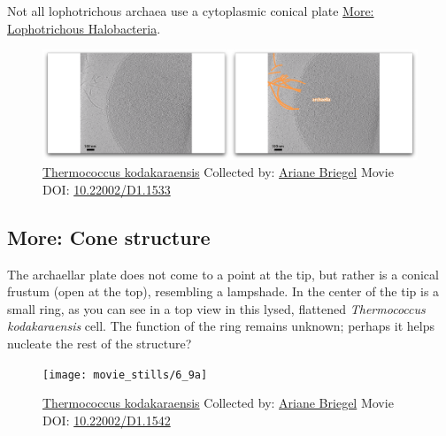 \documentclass[]{tufte-book}
\begin{document}
Not all lophotrichous archaea use a cytoplasmic conical plate
\protect\hyperlink{Lophotrichous_Halobacteria}{More: Lophotrichous
Halobacteria}.





\begin{figure}
\includegraphics{movie_stills/6_9} \caption[\protect\hyperlink{tree}{Thermococcus kodakaraensis} Collected
by: \protect\hyperlink{ariane_briegel}{Ariane Briegel} Movie DOI:
\href{https://doi.org/10.22002/D1.1533}{10.22002/D1.1533}]{\protect\hyperlink{tree}{Thermococcus kodakaraensis} Collected
by: \protect\hyperlink{ariane_briegel}{Ariane Briegel} Movie DOI:
\href{https://doi.org/10.22002/D1.1533}{10.22002/D1.1533}}\label{fig:6-9}
\end{figure}

\hypertarget{Cone_structure}{\subsection*{More: Cone
structure}\label{Cone_structure}}

The archaellar plate does not come to a point at the tip, but rather is
a conical frustum (open at the top), resembling a lampshade. In the
center of the tip is a small ring, as you can see in a top view in this
lysed, flattened \emph{Thermococcus kodakaraensis} cell. The function of
the ring remains unknown; perhaps it helps nucleate the rest of the
structure?





\begin{figure}
\texttt{[image: movie\_stills/6\_9a]} \caption[\protect\hyperlink{tree}{Thermococcus kodakaraensis}
Collected by: \protect\hyperlink{ariane_briegel}{Ariane Briegel} Movie
DOI: \href{https://doi.org/10.22002/D1.1542}{10.22002/D1.1542}]{\protect\hyperlink{tree}{Thermococcus kodakaraensis}
Collected by: \protect\hyperlink{ariane_briegel}{Ariane Briegel} Movie
DOI: \href{https://doi.org/10.22002/D1.1542}{10.22002/D1.1542}}\label{fig:6-9a}
\end{figure}
\end{document}
